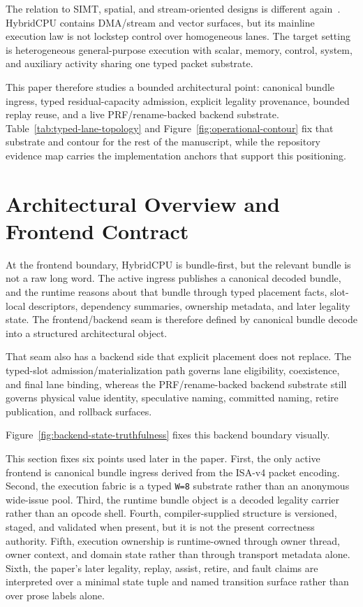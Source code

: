 \documentclass[twocolumn]{article}
\begin{document}
The relation to SIMT, spatial, and stream-oriented designs is different again~\cite{kapasi2002imagine,dally2003merrimac,keckler2011gpus,sankaralingam2003trips,prabhakar2017plasticine,govindaraju2012dyser,jouppi2017tpu}. HybridCPU contains DMA/stream and vector surfaces, but its mainline execution law is not lockstep control over homogeneous lanes. The target setting is heterogeneous general-purpose execution with scalar, memory, control, system, and auxiliary activity sharing one typed packet substrate.

This paper therefore studies a bounded architectural point: canonical bundle ingress, typed residual-capacity admission, explicit legality provenance, bounded replay reuse, and a live PRF/rename-backed backend substrate. Table~\ref{tab:typed-lane-topology} and Figure~\ref{fig:operational-contour} fix that substrate and contour for the rest of the manuscript, while the repository evidence map carries the implementation anchors that support this positioning.


\section{Architectural Overview and Frontend Contract}

At the frontend boundary, HybridCPU is bundle-first, but the relevant bundle is not a raw long word. The active ingress publishes a canonical decoded bundle, and the runtime reasons about that bundle through typed placement facts, slot-local descriptors, dependency summaries, ownership metadata, and later legality state. The frontend/backend seam is therefore defined by canonical bundle decode into a structured architectural object.

That seam also has a backend side that explicit placement does not replace. The typed-slot admission/materialization path governs lane eligibility, coexistence, and final lane binding, whereas the PRF/rename-backed backend substrate still governs physical value identity, speculative naming, committed naming, retire publication, and rollback surfaces.

Figure~\ref{fig:backend-state-truthfulness} fixes this backend boundary visually.



This section fixes six points used later in the paper. First, the only active frontend is canonical bundle ingress derived from the ISA-v4 packet encoding. Second, the execution fabric is a typed \texttt{W=8} substrate rather than an anonymous wide-issue pool. Third, the runtime bundle object is a decoded legality carrier rather than an opcode shell. Fourth, compiler-supplied structure is versioned, staged, and validated when present, but it is not the present correctness authority. Fifth, execution ownership is runtime-owned through owner thread, owner context, and domain state rather than through transport metadata alone. Sixth, the paper's later legality, replay, assist, retire, and fault claims are interpreted over a minimal state tuple and named transition surface rather than over prose labels alone.
\end{document}

